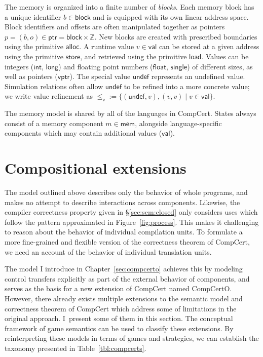 \documentclass[11pt,oneside]{book}
\theoremstyle{definition}
\newcommand{\kw}[1]{\ensuremath{ \mathsf{#1} }}
\newcommand{\vref}{\le_\kw{v}}   %
\begin{document}
The memory is organized into a finite number of \emph{blocks}.
Each memory block has a unique identifier $b \in \kw{block}$
and is equipped with its own linear address space.
Block identifiers and offsets are often manipulated together
as pointers $p = (b, o) \in \kw{ptr} = \kw{block} \times \mathbb{Z}$.
New blocks are created with prescribed boundaries
using the primitive $\kw{alloc}$.
A runtime value $v \in \kw{val}$ can be stored at
a given address using the primitive \kw{store},
and retrieved using the primitive \kw{load}.
Values can be integers (\kw{int}, \kw{long}) and
floating point numbers (\kw{float}, \kw{single})
of different sizes,
as well as pointers (\kw{vptr}).
The special value \kw{undef}
represents an undefined value.
Simulation relations
often allow $\kw{undef}$
to be refined into a more concrete value;
we write value refinement as
${\vref} := \{(\kw{undef}, v), (v, v) \mid v \in \kw{val}\}$.

The memory model is shared by all of the languages in CompCert.
States always consist of
a memory component $m \in \kw{mem}$,
alongside language-specific components
which may contain additional values ($\kw{val}$).




\section{Compositional extensions} \label{sec:compcert-ext} %

The model outlined above
describes only the behavior of whole programs,
and makes no attempt to describe interactions across components.
Likewise,
the compiler correctness property
given in \S\ref{sec:sem:closed}
only considers uses which follow
the pattern approximated in Figure~\ref{fig:process}.
This makes it challenging to reason about
the behavior of individual compilation units.
To formulate a more fine-grained and flexible
version of the correctness theorem of CompCert,
we need an account of
the behavior of individual translation units.

The model I introduce in Chapter~\ref{sec:compcerto}
achieves this by modeling control transfers explicitly
as part of the external behavior of components,
and serves as the basis for a new extension of CompCert
named CompCertO.
However,
there already exists multiple extensions
to the semantic model
and correctness theorem of CompCert
which address some of limitations
in the original approach.
I~present some of them in this section.
The conceptual framework of game semantics
can be used to classify these extensions.
By reinterpreting these models
in terms of games and strategies,
we can establish the taxonomy presented in
Table~\ref{tbl:compcerts}.
\end{document}
